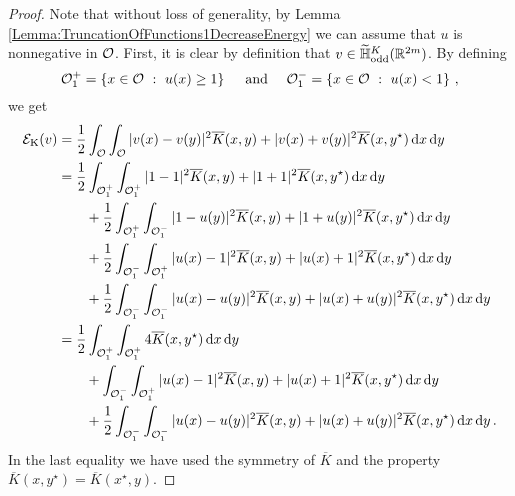 \begin{proof}
Note that without loss of generality, by Lemma \ref{Lemma:TruncationOfFunctions1DecreaseEnergy} we can assume that $u$ is nonnegative in $\mathcal{O}$. First, it is clear by definition that $v\in \widetilde{\mathbb{H}}^K_{\mathrm{odd}}(\mathbb{R}^{2m})$. By defining
$$ \mathcal{O}_1^+ = \left \{ x\in \mathcal{O} \ : \  u(x)\geq 1 \right \} \quad \textrm{ and } \quad  \mathcal{O}_1^- = \left \{ x\in \mathcal{O} \ : \ u(x)< 1 \right \}\,, $$
we get
\begin{align*}
\mathcal{E}_\mathrm{K}(v) &= \frac{1}{2}\int_{\mathcal{O}} \int_{\mathcal{O}}|v(x) - v(y)|^2 \overline{K}(x,y) + |v(x) + v(y)|^2 \overline{K}(x,y^\star) \,\mathrm{d} x \,\mathrm{d} y \\
&= \frac{1}{2}\int_{\mathcal{O}_1^+} \int_{\mathcal{O}_1^+} |1 - 1|^2 \overline{K}(x,y) + |1 + 1|^2 \overline{K}(x,y^\star) \,\mathrm{d} x \,\mathrm{d} y \\
&\quad \quad+ \frac{1}{2}\int_{\mathcal{O}_1^+} \int_{\mathcal{O}_1^-}|1 - u(y)|^2 \overline{K}(x,y) + |1 + u(y)|^2 \overline{K}(x,y^\star)  \,\mathrm{d} x \,\mathrm{d} y \\
&\quad \quad+ \frac{1}{2}\int_{\mathcal{O}_1^-} \int_{\mathcal{O}_1^+}|u(x) - 1|^2 \overline{K}(x,y) + |u(x) + 1|^2 \overline{K}(x,y^\star)\,\mathrm{d} x \,\mathrm{d} y \\
&\quad \quad+ \frac{1}{2}\int_{\mathcal{O}_1^-} \int_{\mathcal{O}_1^-} |u(x) - u(y)|^2 \overline{K}(x,y) + |u(x) + u(y)|^2 \overline{K}(x,y^\star)\,\mathrm{d} x \,\mathrm{d} y\\
&= \frac{1}{2}\int_{\mathcal{O}_1^+} \int_{\mathcal{O}_1^+} 4 \overline{K}(x,y^\star) \,\mathrm{d} x \,\mathrm{d} y \\
&\quad \quad+ \int_{\mathcal{O}_1^-} \int_{\mathcal{O}_1^+}|u(x) - 1|^2 \overline{K}(x,y) + |u(x) + 1|^2 \overline{K}(x,y^\star)\,\mathrm{d} x \,\mathrm{d} y \\
&\quad \quad+ \frac{1}{2}\int_{\mathcal{O}_1^-} \int_{\mathcal{O}_1^-} |u(x) - u(y)|^2 \overline{K}(x,y) + |u(x) + u(y)|^2 \overline{K}(x,y^\star)\,\mathrm{d} x \,\mathrm{d} y\,.
\end{align*}
In the last equality we have used the symmetry of $\overline{K}$ and the property $\overline{K}(x,y^\star) =\overline{K}(x^\star,y)$.


\end{proof}
